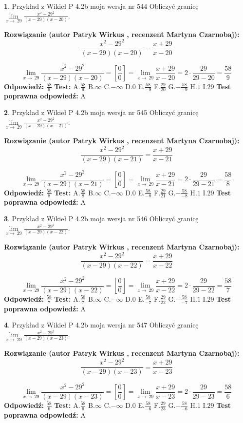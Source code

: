 \documentclass[12pt, a4paper]{article}
\theoremstyle{definition} %
\newtheorem{zad}{}
\newcommand{\zadStart}[1]{\begin{zad}#1\newline}
\newcommand{\zadStop}{\end{zad}}
\newcommand{\rozwStart}[2]{\noindent \textbf{Rozwiązanie (autor #1 , recenzent #2): }\newline}
\newcommand{\rozwStop}{\newline}
\newcommand{\odpStart}{\noindent \textbf{Odpowiedź:}\newline}
\newcommand{\odpStop}{\newline}
\newcommand{\testStart}{\noindent \textbf{Test:}\newline}
\newcommand{\testStop}{\newline}
\newcommand{\kluczStart}{\noindent \textbf{Test poprawna odpowiedź:}\newline}
\newcommand{\kluczStop}{\newline}
\begin{document}
\zadStart{Przykład z Wikieł P 4.2b moja wersja nr 544}
Obliczyć granicę $\lim\limits_{x\to\ 29}\frac{x^{2}-29^{2}}{(x-29)(x-20)}$.
\zadStop
\rozwStart{Patryk Wirkus}{Martyna Czarnobaj}
$$\frac{x^{2}-29^{2}}{(x-29)(x-20)}=\frac{x+29}{x-20}$$

$$\lim\limits_{x\to\ 29}\frac{x^{2}-29^{2}}{(x-29)(x-20)}=[\frac{0}{0}]=\lim\limits_{x\to\ 29}\frac{x+29}{x-20}=2 \cdot \frac{29}{29-20} = \frac{58}{9}$$
\rozwStop
\odpStart
$\frac{58}{9}$
\odpStop
\testStart
A.$\frac{58}{9}$
B.$\infty$
C.$-\infty$
D.$0$
E.$\frac{58}{-9}$
F.$\frac{29}{20}$
G.$-\frac{58}{-9}$
H.$1$
I.$29$
\testStop
\kluczStart
A
\kluczStop



\zadStart{Przykład z Wikieł P 4.2b moja wersja nr 545}
Obliczyć granicę $\lim\limits_{x\to\ 29}\frac{x^{2}-29^{2}}{(x-29)(x-21)}$.
\zadStop
\rozwStart{Patryk Wirkus}{Martyna Czarnobaj}
$$\frac{x^{2}-29^{2}}{(x-29)(x-21)}=\frac{x+29}{x-21}$$

$$\lim\limits_{x\to\ 29}\frac{x^{2}-29^{2}}{(x-29)(x-21)}=[\frac{0}{0}]=\lim\limits_{x\to\ 29}\frac{x+29}{x-21}=2 \cdot \frac{29}{29-21} = \frac{58}{8}$$
\rozwStop
\odpStart
$\frac{58}{8}$
\odpStop
\testStart
A.$\frac{58}{8}$
B.$\infty$
C.$-\infty$
D.$0$
E.$\frac{58}{-8}$
F.$\frac{29}{21}$
G.$-\frac{58}{-8}$
H.$1$
I.$29$
\testStop
\kluczStart
A
\kluczStop



\zadStart{Przykład z Wikieł P 4.2b moja wersja nr 546}
Obliczyć granicę $\lim\limits_{x\to\ 29}\frac{x^{2}-29^{2}}{(x-29)(x-22)}$.
\zadStop
\rozwStart{Patryk Wirkus}{Martyna Czarnobaj}
$$\frac{x^{2}-29^{2}}{(x-29)(x-22)}=\frac{x+29}{x-22}$$

$$\lim\limits_{x\to\ 29}\frac{x^{2}-29^{2}}{(x-29)(x-22)}=[\frac{0}{0}]=\lim\limits_{x\to\ 29}\frac{x+29}{x-22}=2 \cdot \frac{29}{29-22} = \frac{58}{7}$$
\rozwStop
\odpStart
$\frac{58}{7}$
\odpStop
\testStart
A.$\frac{58}{7}$
B.$\infty$
C.$-\infty$
D.$0$
E.$\frac{58}{-7}$
F.$\frac{29}{22}$
G.$-\frac{58}{-7}$
H.$1$
I.$29$
\testStop
\kluczStart
A
\kluczStop



\zadStart{Przykład z Wikieł P 4.2b moja wersja nr 547}
Obliczyć granicę $\lim\limits_{x\to\ 29}\frac{x^{2}-29^{2}}{(x-29)(x-23)}$.
\zadStop
\rozwStart{Patryk Wirkus}{Martyna Czarnobaj}
$$\frac{x^{2}-29^{2}}{(x-29)(x-23)}=\frac{x+29}{x-23}$$

$$\lim\limits_{x\to\ 29}\frac{x^{2}-29^{2}}{(x-29)(x-23)}=[\frac{0}{0}]=\lim\limits_{x\to\ 29}\frac{x+29}{x-23}=2 \cdot \frac{29}{29-23} = \frac{58}{6}$$
\rozwStop
\odpStart
$\frac{58}{6}$
\odpStop
\testStart
A.$\frac{58}{6}$
B.$\infty$
C.$-\infty$
D.$0$
E.$\frac{58}{-6}$
F.$\frac{29}{23}$
G.$-\frac{58}{-6}$
H.$1$
I.$29$
\testStop
\kluczStart
A
\kluczStop
\end{document}

